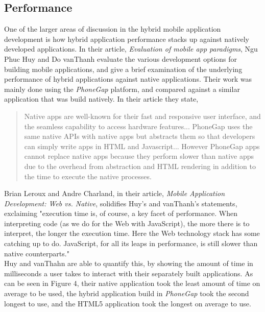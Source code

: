\documentclass[11pt, twocolumn]{article}
\begin{document}
\subsection{Performance}
One of the larger areas of discussion in the hybrid mobile application development is how hybrid application performance stacks up against natively developed applications.  In their article, {\it Evaluation of mobile app paradigms}, Ngu Phuc Huy and Do vanThanh evaluate the various development options for building mobile applications, and give a brief examination of the underlying performance of hybrid applications against native applications.  Their work was mainly done using the {\it PhoneGap} platform, and compared against a similar application that was build natively.  In their article they state,

\begin{quote}
Native apps are well-known for their fast and responsive user interface, and the seamless capability to access hardware features... PhoneGap uses the same native APIs with native apps but abstracts them so that developers can simply write apps in HTML and Javascript... However PhoneGap apps cannot replace native apps because they perform slower than native apps due to the overhead from abstraction and HTML rendering in addition to the time to execute the native processes. ~\cite{Huy2012}
\end{quote}

Brian Leroux and Andre Charland, in their article, {\it Mobile Application Development: Web vs. Native}, solidifies Huy's and vanThanh's statements, exclaiming "execution time is, of course, a key facet of performance.  When interpreting code (as we do for the Web with JavaScript), the more there is to interpret, the longer the execution time.  Here the Web technology stack has some catching up to do.  JavaScript, for all its leaps in performance, is still slower than native counterparts." ~\cite{Leroux2011}\\

Huy and vanThahn are able to quantify this, by showing the amount of time in milliseconds a user takes to interact with their separately built applications.  As can be seen in Figure 4, their native application took the least amount of time on average to be used, the hybrid application build in {\it PhoneGap} took the second longest to use, and the HTML5 application took the longest on average to use.
\end{document}

